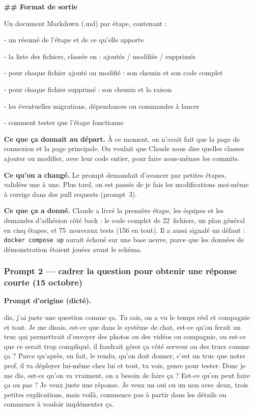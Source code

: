\documentclass[11pt,a4paper]{article}
\begin{document}
\begin{prompt}
\vspace{0.45em}
\textbf{\#\# Format de sortie}\par
Un document Markdown (.md) par étape, contenant :\par
- un résumé de l'étape et de ce qu'elle apporte\par
- la liste des fichiers, classée en : ajoutés / modifiés / supprimés\par
- pour chaque fichier ajouté ou modifié : son chemin et son code complet\par
- pour chaque fichier supprimé : son chemin et la raison\par
- les éventuelles migrations, dépendances ou commandes à lancer\par
- comment tester que l'étape fonctionne\par
\end{prompt}

\textbf{Ce que ça donnait au départ.} À ce moment, on n'avait fait que la page de connexion et la page principale. On voulait que Claude nous dise quelles classes ajouter ou modifier, avec leur code entier, pour faire nous-mêmes les commits.

\textbf{Ce qu'on a changé.} Le prompt demandait d'avancer par petites étapes, validées une à une. Plus tard, on est passés de \og je fais les modifications moi-même \fg{} à \og corrige dans des pull requests \fg{} (prompt~3).

\textbf{Ce que ça a donné.} Claude a livré la première étape, les équipes et les demandes d'adhésion côté back : le code complet de 22~fichiers, un plan général en cinq étapes, et 75~nouveaux tests (156 en tout). Il a aussi signalé un défaut : \texttt{docker compose up} aurait échoué sur une base neuve, parce que les données de démonstration étaient jouées avant le schéma.

\subsubsection*{Prompt 2 — cadrer la question pour obtenir une réponse courte (15 octobre)}

\begin{prompt}
\textbf{Prompt d'origine (dicté).}\par\vspace{0.3em}
dis, j'ai juste une question comme ça. Tu sais, on a vu le temps réel et compagnie et tout. Je me disais, est-ce que dans le système de chat, est-ce qu'on ferait un truc qui permettrait d'envoyer des photos ou des vidéos ou compagnie, ou est-ce que ce serait trop compliqué, il faudrait gérer ça côté serveur ou des trucs comme ça ? Parce qu'après, en fait, le rendu, qu'on doit donner, c'est un truc que notre prof, il va déployer lui-même chez lui et tout, tu vois, genre pour tester. Donc je me dis, est-ce qu'on va vraiment, on a besoin de faire ça ? Est-ce qu'on peut faire ça ou pas ? Je veux juste une réponse. Je veux un oui ou un non avec deux, trois petites explications, mais voilà, commence pas à partir dans les détails ou commence à vouloir implémenter ça.
\end{prompt}
\end{document}
